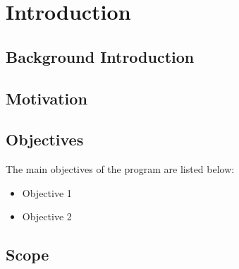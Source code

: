 \documentclass[a4paper, 12pt]{report}
\title{\projectTitle}
\author{Niyoj Oli}
\date{\projectDate}
\begin{document}





\onehalfspacing

\pagestyle{plain} %







\tableofcontents
\newpage

\listoffigures
\newpage

\listoftables
\newpage

\printglossary[type=acronym,style=acronyms]
\newpage

\pagestyle{fancy}    %

\chapter{Introduction}
\lipsum[10]

\section{Background Introduction}
\lipsum[15]

\section{Motivation}
\lipsum[5]

\lipsum[10]\cite{einstein}

\section{Objectives}
The main objectives of the program are listed below:
\begin{itemize}
    \item Objective 1
    \item Objective 2
\end{itemize}

\section{Scope}
\lipsum[5]
\end{document}
